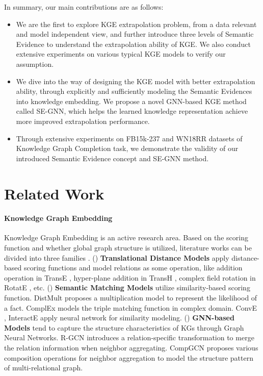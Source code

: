 \documentclass[letterpaper]{article} \usepackage{aaai22}  \usepackage{times}  \usepackage{helvet}  \usepackage{courier}  \usepackage[hyphens]{url}  \usepackage{graphicx} \urlstyle{rm} \def\UrlFont{\rm}  \usepackage{natbib}  \usepackage{caption} \DeclareCaptionStyle{ruled}{labelfont=normalfont,labelsep=colon,strut=off} \frenchspacing  \setlength{\pdfpagewidth}{8.5in}  \setlength{\pdfpageheight}{11in}  \usepackage{algorithm}
\begin{document}
In summary, our main contributions are as follows: 
\begin{itemize}
    \item We are the first to explore KGE extrapolation problem, from a data relevant and model independent view, and further introduce three levels of Semantic Evidence to understand the extrapolation ability of KGE. We also conduct extensive experiments on various typical KGE models to verify our assumption. 
    \item We dive into the way of designing the KGE model with better extrapolation ability, through explicitly and sufficiently modeling the Semantic Evidences into knowledge embedding. We propose a novel GNN-based KGE method called SE-GNN, which helps the learned knowledge representation achieve more improved extrapolation performance. 
    \item Through extensive experiments on FB15k-237 and WN18RR datasets of Knowledge Graph Completion task, we demonstrate the validity of our introduced Semantic Evidence concept and SE-GNN method.
\end{itemize}

\section{Related Work}

\paragraph{Knowledge Graph Embedding}
Knowledge Graph Embedding is an active research area. Based on the scoring function and whether global graph structure is utilized, literature works can be divided into three families \cite{TKDE_2017_Wang_Survey, 2020_Arora_KG-GNN}.
() \textbf{Translational Distance Models} apply distance-based scoring functions and model relations as some operation, like addition operation in TransE \cite{NeurIPS_2013_Bordes_TransE}, hyper-plane addition in TransH \cite{AAAI_2014_Wang_TransH}, 
complex field rotation in RotatE \cite{ICLR_2019_Sun_RotatE}, etc. 
() \textbf{Semantic Matching Models} utilize similarity-based scoring function. DistMult \cite{ICLR_2015_Yang_DistMult} proposes a multiplication model to represent the likelihood of a fact. ComplEx \cite{ICML_2016_Trouillon_ComplEx} models the triple matching function in complex domain. ConvE \cite{AAAI_2018_Dettmers_ConvE_WN18RR}, InteractE \cite{AAAI_2020_Vashishth_InteractE} apply neural network for similarity modeling. 
() \textbf{GNN-based Models} tend to capture the structure characteristics of KGs through Graph Neural Networks. R-GCN \cite{ESWC_2018_Schlichtkrull_R-GCN} introduces a relation-specific transformation to merge the relation information when neighbor aggregating. CompGCN \cite{ICLR_2020_Vashishth_CompGCN} proposes various composition operations for neighbor aggregation to model the structure pattern of multi-relational graph. 
\end{document}
